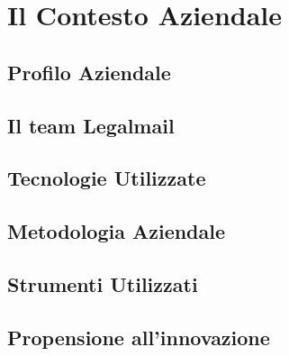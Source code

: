 
\chapter{Il Contesto Aziendale}
\label{cap:introduzione}
\section{Profilo Aziendale}
\section{Il team Legalmail}
\section{Tecnologie Utilizzate}
\section{Metodologia Aziendale}
\section{Strumenti Utilizzati}
\section{Propensione all'innovazione}